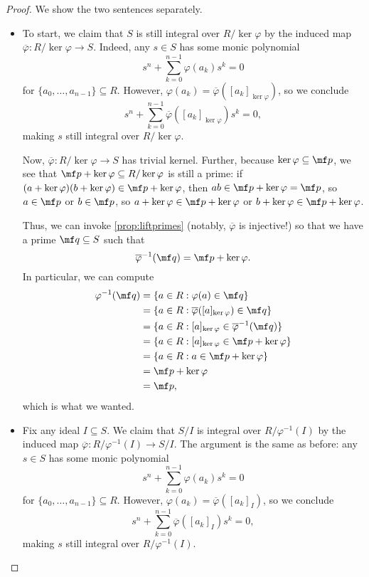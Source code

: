 \begin{proof}
	We show the two sentences separately.
	\begin{itemize}
		\item To start, we claim that $S$ is still integral over $R/\ker\varphi$ by the induced map $\overline\varphi:R/\ker\varphi\to S$. Indeed, any $s\in S$ has some monic polynomial
		\[s^n+\sum_{k=0}^{n-1}\varphi(a_k)s^k=0\]
		for $\{a_0,\ldots,a_{n-1}\}\subseteq R$. However, $\varphi(a_k)=\overline\varphi([a_k]_{\ker\varphi})$, so we conclude
		\[s^n+\sum_{k=0}^{n-1}\overline\varphi([a_k]_{\ker\varphi})s^k=0,\]
		making $s$ still integral over $R/\ker\varphi$.

		Now, $\overline\varphi:R/\ker\varphi\to S$ has trivial kernel. Further, because $\ker\varphi\subseteq\mf p$, we see that $\mf p+\ker\varphi\subseteq R/\ker\varphi$ is still a prime: if $(a+\ker\varphi)(b+\ker\varphi)\in\mf p+\ker\varphi$, then $ab\in\mf p+\ker\varphi=\mf p$, so $a\in\mf p$ or $b\in\mf p$, so $a+\ker\varphi\in\mf p+\ker\varphi$ or $b+\ker\varphi\in\mf p+\ker\varphi$.

		Thus, we can invoke \autoref{prop:liftprimes} (notably, $\overline\varphi$ is injective!) so that we have a prime $\mf q\subseteq S$ such that
		\[\overline\varphi^{-1}(\mf q)=\mf p+\ker\varphi.\]
		In particular, we can compute
		\begin{align*}
			\varphi^{-1}(\mf q) &= \{a\in R:\varphi(a)\in\mf q\} \\
			&= \{a\in R:\overline\varphi([a]_{\ker\varphi})\in\mf q\} \\
			&= \{a\in R:[a]_{\ker\varphi}\in\overline\varphi^{-1}(\mf q)\} \\
			&= \{a\in R:[a]_{\ker\varphi}\in\mf p+\ker\varphi\} \\
			&= \{a\in R:a\in\mf p+\ker\varphi\} \\
			&= \mf p+\ker\varphi \\
			&= \mf p,
		\end{align*}
		which is what we wanted.

		\item Fix any ideal $I\subseteq S$. We claim that $S/I$ is integral over $R/\varphi^{-1}(I)$ by the induced map $\overline\varphi:R/\varphi^{-1}(I)\to S/I$. The argument is the same as before: any $s\in S$ has some monic polynomial
		\[s^n+\sum_{k=0}^{n-1}\varphi(a_k)s^k=0\]
		for $\{a_0,\ldots,a_{n-1}\}\subseteq R$. However, $\varphi(a_k)=\overline\varphi([a_k]_I)$, so we conclude
		\[s^n+\sum_{k=0}^{n-1}\overline\varphi([a_k]_I)s^k=0,\]
		making $s$ still integral over $R/\varphi^{-1}(I)$.


\end{itemize}
\end{proof}
